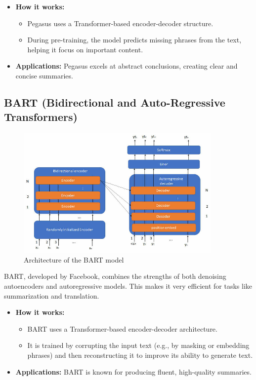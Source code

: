 \documentclass[conference]{IEEEtran}
\begin{document}
\begin{itemize}
    \item \textbf{How it works:}
    \begin{itemize}
        \item Pegasus uses a Transformer-based encoder-decoder structure.
        \item During pre-training, the model predicts missing phrases from the text, helping it focus on important content.
    \end{itemize}
    \item \textbf{Applications:} Pegasus excels at abstract conclusions, creating clear and concise summaries.
\end{itemize}



\subsection{BART (Bidirectional and Auto-Regressive Transformers)}

\begin{figure}[htbp]
    \centering
    \includegraphics[width=10cm]{The-BART-model-architecture.png} %
    \caption{Architecture of the BART model}
    \label{fig:bart_architecture}
\end{figure}

BART, developed by Facebook, combines the strengths of both denoising autoencoders and autoregressive models. This makes it very efficient for tasks like summarization and translation.

\begin{itemize}
    \item \textbf{How it works:}
    \begin{itemize}
        \item BART uses a Transformer-based encoder-decoder architecture.
        \item It is trained by corrupting the input text (e.g., by masking or embedding phrases) and then reconstructing it to improve its ability to generate text.
    \end{itemize}
    \item \textbf{Applications:} BART is known for producing fluent, high-quality summaries.
\end{itemize}
\end{document}
